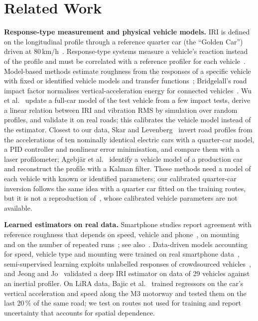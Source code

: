 \section{Related Work}
\label{sec:related}

\textbf{Response-type measurement and physical vehicle models.}
IRI is defined on the longitudinal profile through a reference quarter car (the ``Golden Car'') driven at 80\,km/h~\cite{sayers1986tp45,sayers1995iri,astm_e1926}.
Response-type systems measure a vehicle's reaction instead of the profile and must be correlated with a reference profiler for each vehicle~\cite{sayers1986tp46}.
Model-based methods estimate roughness from the responses of a specific vehicle with fixed or identified vehicle models and transfer functions~\cite{gonzalez2008accel,zhao2017freq}; Bridgelall's road impact factor normalises vertical-acceleration energy for connected vehicles~\cite{bridgelall2014rif}.
Wu et al.~\cite{wu2023calib} update a full-car model of the test vehicle from a few impact tests, derive a linear relation between IRI and vibration RMS by simulation over random profiles, and validate it on real roads; this calibrates the vehicle model instead of the estimator.
Closest to our data, Skar and Levenberg~\cite{skar2024inversion} invert road profiles from the accelerations of ten nominally identical electric cars with a quarter-car model, a PID controller and nonlinear error minimisation, and compare them with a laser profilometer; Agebj\"ar et al.~\cite{agebjar2025fusion} identify a vehicle model of a production car and reconstruct the profile with a Kalman filter.
These methods need a model of each vehicle with known or identified parameters; our calibrated quarter-car inversion follows the same idea with a quarter car fitted on the training routes, but it is not a reproduction of~\cite{skar2024inversion}, whose calibrated vehicle parameters are not available.

\textbf{Learned estimators on real data.}
Smartphone studies report agreement with reference roughness that depends on speed, vehicle and phone~\cite{thilak2021}, on mounting~\cite{mounting2026} and on the number of repeated runs~\cite{opara2022roughness}; see also~\cite{hanson2014iri,sattar2018review,evalframework2023}.
Data-driven models accounting for speed, vehicle type and mounting were trained on real smartphone data~\cite{sang2024iri}, semi-supervised learning exploits unlabelled responses of crowdsourced vehicles~\cite{zhang2026semisup,trc2021crowd}, and Jeong and Jo~\cite{jeongjo2024irinet} validated a deep IRI estimator on data of 29 vehicles against an inertial profiler.
On LiRA data, Bajic et al.~\cite{bajic2021ml} trained regressors on the car's vertical acceleration and speed along the M3 motorway and tested them on the last 20\,\% of the same road; we test on routes not used for training and report uncertainty that accounts for spatial dependence.

